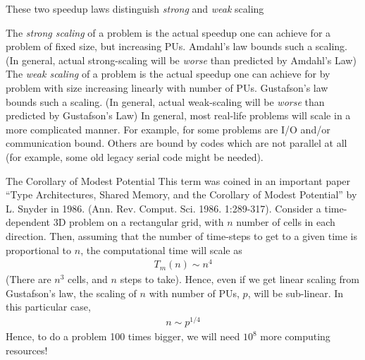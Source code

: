 \documentclass[aspectratio=169]{beamer}
\newcommand{\mypause}{}
\begin{document}
\begin{frame}{These two speedup laws distinguish \emph{strong} and
    \emph{weak} scaling}

  The \emph{strong scaling} of a problem is the actual speedup one can
  achieve for a problem of fixed size, but increasing PUs. Amdahl's
  law bounds such a scaling. (In general, actual strong-scaling will
  be \emph{worse} than predicted by Amdahl's Law)%
  \mypause%
  \vskip0.1in%
  The \emph{weak scaling} of a problem is the actual speedup one can
  achieve for by problem with size increasing linearly with number of
  PUs. Gustafson's law bounds such a scaling. (In general, actual
  weak-scaling will be \emph{worse} than predicted by Gustafson's
  Law)%
  \mypause%
  \vskip0.1in%
  In general, most real-life problems will scale in a more complicated
  manner. For example, for some problems are I/O and/or communication
  bound. Others are bound by codes which are not parallel at all (for
  example, some old legacy serial code might be needed).

\end{frame}

\begin{frame}{The Corollary of Modest Potential}
  This term was coined in an important paper ``Type Architectures,
  Shared Memory, and the Corollary of Modest Potential'' by L. Snyder
  in 1986. (Ann. Rev. Comput. Sci. 1986. 1:289-317).%
  \vskip0.1in%
  Consider a time-dependent 3D problem on a rectangular grid, with $n$
  number of cells in each direction. Then, assuming that the number of
  time-steps to get to a given time is proportional to $n$, the
  computational time will scale as
  \begin{align*}
    T_m(n) \sim n^4
  \end{align*}
  (There are $n^3$ cells, and $n$ steps to take). Hence, even if we
  get linear scaling from Gustafson's law, the scaling of $n$ with
  number of PUs, $p$, will be sub-linear. In this particular case,
  \begin{align*}
    n \sim p^{1/4}
  \end{align*}
  {\color{blue} Hence, to do a problem 100 times bigger, we will need
    $10^8$ more computing resources!}%
\end{frame}
\end{document}
